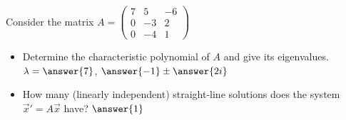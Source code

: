 \documentclass{ximera}
\begin{document}
\begin{exercise}
    Consider the matrix
    $A=\displaystyle \begin{pmatrix} 
        7 & 5 & -6 \\
        0 & -3 & 2 \\
        0  & -4 & 1 
    \end{pmatrix}$
    \begin{itemize}
        \item Determine the characteristic polynomial of $A$ and give its eigenvalues.\\
            $\lambda = \answer{7}$, $\answer{-1}\pm \answer{2i}$
        \item How many (linearly independent) straight-line solutions does the system ${\vec{x}}'=A\vec{x}$ have? $\answer{1}$ %
    \end{itemize}
\end{exercise}
\end{document}
